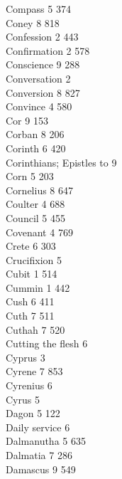 Compass \hfill 5 \quad \phantom{0}374\\
Coney \hfill 8 \quad \phantom{0}818\\
Confession \hfill 2 \quad \phantom{0}443\\
Confirmation \hfill 2 \quad \phantom{0}578\\
Conscience \hfill 9 \quad \phantom{0}288\\
Conversation \hfill 2 \\
Conversion \hfill 8 \quad \phantom{0}827\\
Convince \hfill 4 \quad \phantom{0}580\\
Cor \hfill 9 \quad \phantom{0}153\\
Corban \hfill 8 \quad \phantom{0}206\\
Corinth \hfill 6 \quad \phantom{0}420\\
Corinthians; Epistles to \hfill 9 \\
Corn \hfill 5 \quad \phantom{0}203\\
Cornelius \hfill 8 \quad \phantom{0}647\\
Coulter \hfill 4 \quad \phantom{0}688\\
Council \hfill 5 \quad \phantom{0}455\\
Covenant \hfill 4 \quad \phantom{0}769\\
Crete \hfill 6 \quad \phantom{0}303\\
Crucifixion \hfill 5 \\
Cubit \hfill 1 \quad \phantom{0}514\\
Cummin \hfill 1 \quad \phantom{0}442\\
Cush \hfill 6 \quad \phantom{0}411\\
Cuth \hfill 7 \quad \phantom{0}511\\
Cuthah \hfill 7 \quad \phantom{0}520\\
Cutting the flesh \hfill 6 \\
Cyprus \hfill 3 \\
Cyrene \hfill 7 \quad \phantom{0}853\\
Cyrenius \hfill 6 \\
Cyrus \hfill 5 \\
Dagon \hfill 5 \quad \phantom{0}122\\
Daily service \hfill 6 \\
Dalmanutha \hfill 5 \quad \phantom{0}635\\
Dalmatia \hfill 7 \quad \phantom{0}286\\
Damascus \hfill 9 \quad \phantom{0}549\\
